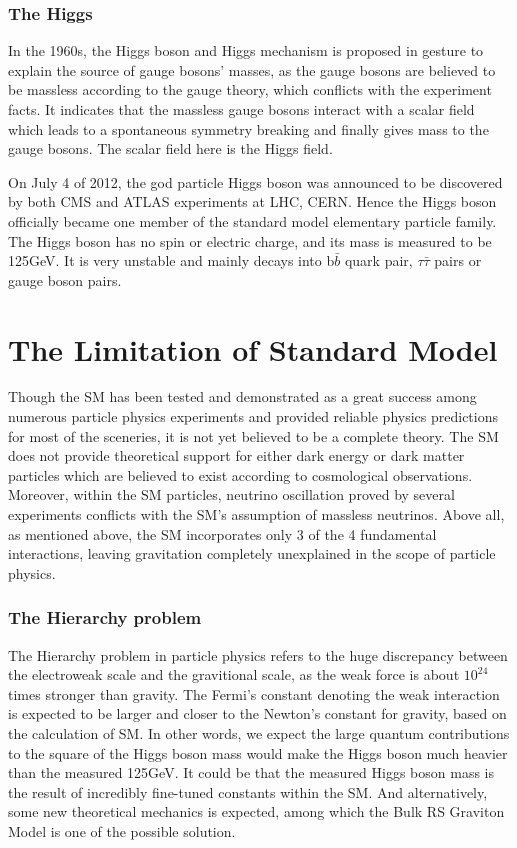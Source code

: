 \subsubsection{The Higgs}
In the 1960s, the Higgs boson and Higgs mechanism is proposed in gesture to explain the source of gauge bosons' masses\cite{higgstheory1,higgstheory2,higgstheory3}, as the gauge bosons are believed to be massless according to the gauge theory, which conflicts with the experiment facts. It indicates that the massless gauge bosons interact with a scalar field which leads to a spontaneous symmetry breaking and finally gives mass to the gauge bosons. The scalar field here is the Higgs field. 

\vspace{0.3cm}
On July 4 of 2012, the god particle Higgs boson was announced to be discovered by both CMS and ATLAS experiments at LHC, CERN\cite{higgsdiscover1,higgsdiscover2}. Hence the Higgs boson officially became one member of the standard model elementary particle family. The Higgs boson has no spin or electric charge, and its mass is measured to be 125GeV. It is very unstable and mainly decays into b$\bar{b}$ quark pair, $\tau\bar{\tau}$ pairs or gauge boson pairs.

\section{The Limitation of Standard Model}
Though the SM has been tested and demonstrated as a great success among numerous particle physics experiments and provided reliable physics predictions for most of the sceneries, it is not yet believed to be a complete theory. The SM does not provide theoretical support for either dark energy or dark matter particles which are believed to exist according to cosmological observations. Moreover, within the SM particles, neutrino oscillation proved by several experiments conflicts with the SM's assumption of massless neutrinos. Above all, as mentioned above, the SM incorporates only 3 of the 4 fundamental interactions, leaving gravitation completely unexplained in the scope of particle physics.
\subsubsection{The Hierarchy problem}
The Hierarchy problem in particle physics refers to the huge discrepancy between the electroweak scale and the gravitional scale, as the weak force is about $10^{24}$ times stronger than gravity. The Fermi's constant denoting the weak interaction is expected to be larger and closer to the Newton's constant for gravity, based on the calculation of SM. In other words, we expect the large quantum contributions to the square of the Higgs boson mass would make the Higgs boson much heavier than the measured 125GeV. It could be that the measured Higgs boson mass is the result of incredibly fine-tuned constants within the SM. And alternatively, some new theoretical mechanics is expected, among which the Bulk RS Graviton Model is one of the possible solution.

